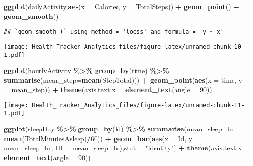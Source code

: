 \documentclass[
]{article}
\newenvironment{Shaded}{\begin{snugshade}}{\end{snugshade}}
\newcommand{\AttributeTok}[1]{\textcolor[rgb]{0.13,0.29,0.53}{#1}}
\newcommand{\DecValTok}[1]{\textcolor[rgb]{0.00,0.00,0.81}{#1}}
\newcommand{\FunctionTok}[1]{\textcolor[rgb]{0.13,0.29,0.53}{\textbf{#1}}}
\newcommand{\NormalTok}[1]{#1}
\newcommand{\SpecialCharTok}[1]{\textcolor[rgb]{0.81,0.36,0.00}{\textbf{#1}}}
\newcommand{\StringTok}[1]{\textcolor[rgb]{0.31,0.60,0.02}{#1}}
\begin{document}
\begin{Shaded}
\begin{Highlighting}[]
\FunctionTok{ggplot}\NormalTok{(dailyActivity,}\FunctionTok{aes}\NormalTok{(}\AttributeTok{x =}\NormalTok{ Calories, }\AttributeTok{y =}\NormalTok{ TotalSteps)) }\SpecialCharTok{+} 
  \FunctionTok{geom\_point}\NormalTok{() }\SpecialCharTok{+} 
  \FunctionTok{geom\_smooth}\NormalTok{()}
\end{Highlighting}
\end{Shaded}

\begin{verbatim}
## `geom_smooth()` using method = 'loess' and formula = 'y ~ x'
\end{verbatim}

\texttt{[image: Health\_Tracker\_Analytics\_files/figure-latex/unnamed-chunk-10-1.pdf]}

\begin{Shaded}
\begin{Highlighting}[]
\FunctionTok{ggplot}\NormalTok{(hourlyActivity }\SpecialCharTok{\%\textgreater{}\%} \FunctionTok{group\_by}\NormalTok{(time) }\SpecialCharTok{\%\textgreater{}\%} \FunctionTok{summarise}\NormalTok{(}\AttributeTok{mean\_step=}\FunctionTok{mean}\NormalTok{(StepTotal))) }\SpecialCharTok{+} 
  \FunctionTok{geom\_point}\NormalTok{(}\FunctionTok{aes}\NormalTok{(}\AttributeTok{x =}\NormalTok{ time, }\AttributeTok{y =}\NormalTok{ mean\_step)) }\SpecialCharTok{+} 
  \FunctionTok{theme}\NormalTok{(}\AttributeTok{axis.text.x =} \FunctionTok{element\_text}\NormalTok{(}\AttributeTok{angle =} \DecValTok{90}\NormalTok{)) }
\end{Highlighting}
\end{Shaded}

\texttt{[image: Health\_Tracker\_Analytics\_files/figure-latex/unnamed-chunk-11-1.pdf]}

\begin{Shaded}
\begin{Highlighting}[]
\FunctionTok{ggplot}\NormalTok{(sleepDay }\SpecialCharTok{\%\textgreater{}\%} \FunctionTok{group\_by}\NormalTok{(Id) }\SpecialCharTok{\%\textgreater{}\%} \FunctionTok{summarise}\NormalTok{(}\AttributeTok{mean\_sleep\_hr =} \FunctionTok{mean}\NormalTok{(TotalMinutesAsleep)}\SpecialCharTok{/}\DecValTok{60}\NormalTok{)) }\SpecialCharTok{+} 
  \FunctionTok{geom\_bar}\NormalTok{(}\FunctionTok{aes}\NormalTok{(}\AttributeTok{x =}\NormalTok{ Id, }\AttributeTok{y =}\NormalTok{ mean\_sleep\_hr, }\AttributeTok{fill =}\NormalTok{ mean\_sleep\_hr),}\AttributeTok{stat =} \StringTok{"identity"}\NormalTok{) }\SpecialCharTok{+} 
  \FunctionTok{theme}\NormalTok{(}\AttributeTok{axis.text.x =} \FunctionTok{element\_text}\NormalTok{(}\AttributeTok{angle =} \DecValTok{90}\NormalTok{))  }
\end{Highlighting}
\end{Shaded}
\end{document}
